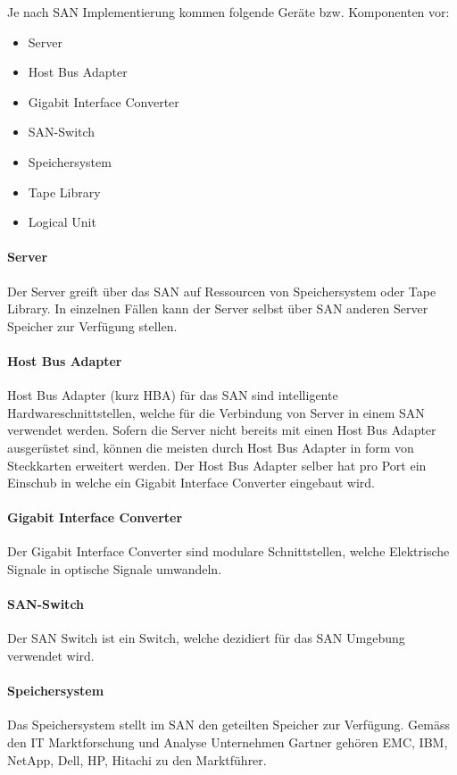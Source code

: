 Je nach SAN Implementierung kommen folgende Geräte bzw. Komponenten vor:
\begin{itemize}
\item Server
\item Host Bus Adapter
\item Gigabit Interface Converter
\item SAN-Switch
\item Speichersystem
\item Tape Library
\item Logical Unit
\end{itemize}

\paragraph*{Server} 
Der Server greift über das SAN auf Ressourcen von Speichersystem oder Tape Library. In einzelnen Fällen kann der Server selbst über SAN anderen Server Speicher zur Verfügung stellen.

\paragraph*{Host Bus Adapter}
Host Bus Adapter (kurz HBA) für das SAN sind intelligente Hardwareschnittstellen, welche für die Verbindung von Server in einem SAN verwendet werden. Sofern die Server nicht bereits mit einen Host Bus Adapter ausgerüstet sind, können die meisten durch Host Bus Adapter in form von Steckkarten erweitert werden. Der Host Bus Adapter selber hat pro Port ein Einschub in welche ein Gigabit Interface Converter eingebaut wird. \cite{Christopher2009}

\paragraph*{Gigabit Interface Converter}
Der Gigabit Interface Converter sind modulare Schnittstellen, welche Elektrische Signale in optische Signale umwandeln.\cite{SNIA2011}

\paragraph*{SAN-Switch}
Der SAN Switch ist ein Switch, welche dezidiert für das SAN Umgebung verwendet wird.

\paragraph*{Speichersystem}
Das Speichersystem stellt im SAN den geteilten Speicher zur Verfügung. Gemäss den \gls{IT} Marktforschung und Analyse Unternehmen Gartner gehören \gls{EMC}, \gls{IBM}, \gls{NetApp}, \gls{Dell}, \gls{HP}, \gls{Hitachi} zu den Marktführer\cite{RogerW.CoxPushanRinnenStanleyZaffos2011}.

